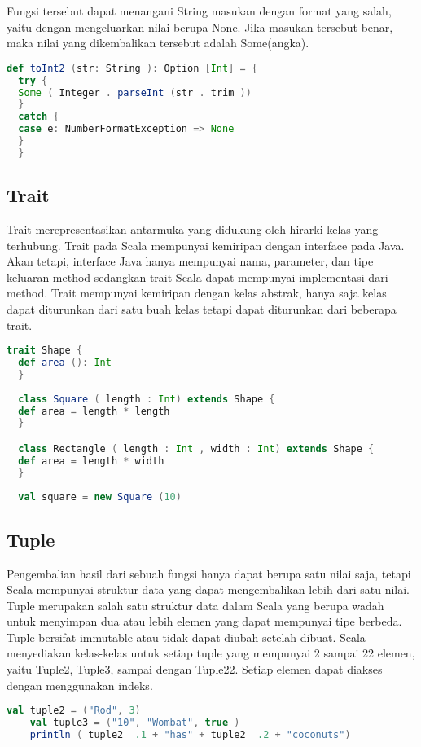 Fungsi tersebut dapat menangani String masukan dengan format yang salah, yaitu dengan
mengeluarkan nilai berupa None. Jika masukan tersebut benar, maka nilai yang dikembalikan
tersebut adalah Some(angka).

\begin{lstlisting}[language=Scala, caption= Contoh pemanfaatan kelas Some dan None]
def toInt2 (str: String ): Option [Int] = {
  try {
  Some ( Integer . parseInt (str . trim ))
  }
  catch {
  case e: NumberFormatException => None
  }
  }
\end{lstlisting}

\subsection{Trait}
Trait merepresentasikan antarmuka yang didukung oleh hirarki kelas yang terhubung. Trait pada
Scala mempunyai kemiripan dengan interface pada Java. Akan tetapi, interface Java hanya
mempunyai nama, parameter, dan tipe keluaran method sedangkan trait Scala dapat mempunyai
implementasi dari method. Trait mempunyai kemiripan dengan kelas abstrak, hanya saja kelas
dapat diturunkan dari satu buah kelas tetapi dapat diturunkan dari beberapa trait.
\begin{lstlisting}[language=Scala, caption= Contoh penggunaan trait]
trait Shape {
  def area (): Int
  }
  
  class Square ( length : Int) extends Shape {
  def area = length * length
  }

  class Rectangle ( length : Int , width : Int) extends Shape {
  def area = length * width
  }
 
  val square = new Square (10)
\end{lstlisting}

\subsection{Tuple}
Pengembalian hasil dari sebuah fungsi hanya dapat berupa satu nilai saja, tetapi Scala mempunyai
struktur data yang dapat mengembalikan lebih dari satu nilai. Tuple merupakan salah satu
struktur data dalam Scala yang berupa wadah untuk menyimpan dua atau lebih elemen yang dapat
mempunyai tipe berbeda. Tuple bersifat immutable atau tidak dapat diubah setelah dibuat. Scala
menyediakan kelas-kelas untuk setiap tuple yang mempunyai 2 sampai 22 elemen, yaitu Tuple2,
Tuple3, sampai dengan Tuple22. Setiap elemen dapat diakses dengan menggunakan indeks.
\begin{lstlisting}[language=Scala, caption= Deklarasi dan penggunaan tuple]
	val tuple2 = ("Rod", 3)
	val tuple3 = ("10", "Wombat", true )
	println ( tuple2 _.1 + "has" + tuple2 _.2 + "coconuts")
\end{lstlisting}

